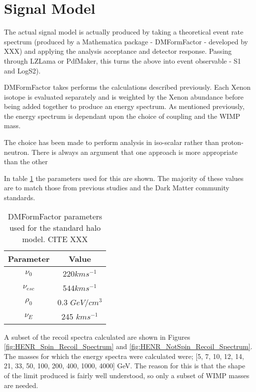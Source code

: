 \section{Signal Model}
\par
The actual signal model is actually produced by taking a theoretical event rate spectrum (produced by a Mathematica package - DMFormFactor - developed by XXX) and applying the analysis acceptance and detector response.
Passing through LZLama or PdfMaker, this turns the above into event observable - S1 and LogS2).
\par
DMFormFactor takes performs the calculations described previously.
Each Xenon isotope is evaluated separately and is weighted by the Xenon abundance before being added together to produce an energy spectrum.
As mentioned previously, the energy spectrum is dependant upon the choice of coupling and the WIMP mass.
\par
The choice has been made to perform analysis in iso-scalar rather than proton-neutron. 
There is always an argument that one approach is more appropriate than the other
\par
In table \ref{tab:DMFormFactor_parameters} the parameters used for this are shown.
The majority of these values are to match those from previous studies and the Dark Matter community standards.

\begin{table}[]
    \centering
    \begin{tabular}{c|c}
        Parameter   & Value  \\ \hline
        $\nu_0$     & 220$km s^{-1}$ \\
        $\nu_{esc}$ & 544$km s^{-1}$ \\
        $\rho_{0}$     & 0.3 $GeV/cm^{3}$ \\
        $\nu_E$     & 245 $km s^{-1}$ 
    \end{tabular}
    \caption{DMFormFactor parameters used for the standard halo model. CITE XXX}
    \label{tab:DMFormFactor_parameters}
\end{table}


\par
A subset of the recoil spectra calculated are shown in Figures \ref{fig:HENR_Spin_Recoil_Spectrum} and \ref{fig:HENR_NotSpin_Recoil_Spectrum}.
The masses for which the energy spectra were calculated were;
[5, 7, 10, 12, 14, 21, 33, 50, 100, 200, 400, 1000, 4000] GeV.
The reason for this is that the shape of the limit produced is fairly well understood, so only a subset of WIMP masses are needed.

